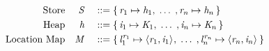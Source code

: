 \begin{displaymath}
  \begin{aligned}
    \textup{Store} && \mathit{S} && \; ::= \; & \{ \, \mathit{r}_1 \mapsto \mathit{h}_1 , \; \ldots \; , \mathit{r}_{n} \mapsto \mathit{h}_{n} \,\} \\
    \textup{Heap} && \mathit{h} && \; ::= \; & \{ \, \mathit{i}_1 \mapsto \mathit{K}_1 , \; \ldots \; , \mathit{i}_{n} \mapsto \mathit{K}_{n} \,\}\\
    \textup{Location Map} && \mathit{M} && \; ::= \; & \{ \, {\mathit{l}}^{\mathit{r}_1}_1 \mapsto \langle \mathit{r}_1, \mathit{i}_1 \rangle ^{} , \; \ldots \; , {\mathit{l}}^{\mathit{r}_n}_n \mapsto \langle \mathit{r}_n, \mathit{i}_n \rangle ^{} \,\}
  \end{aligned}
\end{displaymath}
